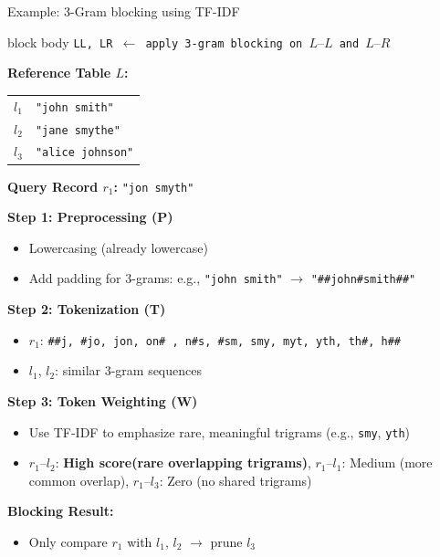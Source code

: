 \documentclass[8pt]{beamer} %
\begin{document}
\begin{frame}{Example: 3-Gram blocking using TF-IDF}
	
	\begin{beamercolorbox}[rounded=true, shadow=true, leftskip=1em, rightskip=1em]{block body}
		\texttt{LL, LR $\leftarrow$ apply 3-gram blocking on $L–L$ and $L–R$}
	\end{beamercolorbox}
	
	
	\vspace{0.5em}
	\textbf{Reference Table $L$:}
	\begin{tabular}{ll}
		$l_1$ & \texttt{"john smith"} \\
		$l_2$ & \texttt{"jane smythe"} \\
		$l_3$ & \texttt{"alice johnson"}
	\end{tabular}
	
	\vspace{0.5em}
	\textbf{Query Record $r_1$:} \texttt{"jon smyth"}
	
	\vspace{0.5em}
	\textbf{Step 1: Preprocessing (P)}
	\begin{itemize}
		\item Lowercasing (already lowercase)
		\item Add padding for 3-grams: e.g., \texttt{"john smith"} $\rightarrow$ \texttt{"\#\#john\#smith\#\#"}
	\end{itemize}
	
	\vspace{0.5em}
	\textbf{Step 2: Tokenization (T)}
	\begin{itemize}
		\item $r_1$: \texttt{\#\#j, \#jo, jon, on\# , n\#s, \#sm, smy, myt, yth, th\#, h\#\#}
		\item $l_1$, $l_2$: similar 3-gram sequences
	\end{itemize}
	
	\vspace{0.5em}
	\textbf{Step 3: Token Weighting (W)}
	\begin{itemize}
		\item Use TF-IDF to emphasize rare, meaningful trigrams (e.g., \texttt{smy}, \texttt{yth})
		\item $r_1$–$l_2$: \textbf{High score(rare overlapping trigrams)}, $r_1$–$l_1$: Medium (more common overlap), $r_1$–$l_3$: Zero (no shared trigrams)
	\end{itemize}
	
	\vspace{0.5em}
	\textbf{Blocking Result:}
	\begin{itemize}
		\item Only compare $r_1$ with $l_1$, $l_2$ $\rightarrow$ prune $l_3$
	\end{itemize}
	
\end{frame}
\end{document}
